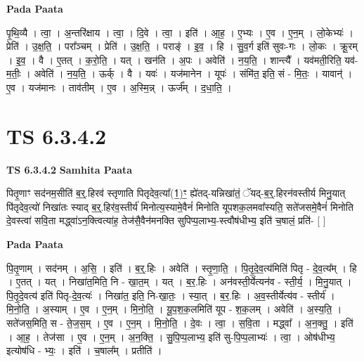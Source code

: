 \documentclass[17pt]{extarticle}
\begin{document}
\textbf{Pada Paata} \newline

पृ॒थि॒व्यै । त्वा॒ । अ॒न्तरि॑क्षाय । त्वा॒ । दि॒वे । त्वा॒ । इति॑ । आ॒ह॒ । ए॒भ्यः । ए॒व । ए॒न॒म् । लो॒केभ्यः॑ । प्रेति॑ । उ॒क्ष॒ति॒ । परा᳚ञ्चम् । प्रेति॑ । उ॒क्ष॒ति॒ । पराङ्॑ । इ॒व॒ । हि । सु॒व॒र्ग इति॑ सुवः-गः । लो॒कः । क्रू॒रम् । इ॒व॒ । वै । ए॒तत् । क॒रो॒ति॒ । यत् । खन॑ति । अ॒पः । अवेति॑ । न॒य॒ति॒ । शान्त्यै᳚ । यव॑मती॒रिति॒ यव॑-म॒तीः॒ । अवेति॑ । न॒य॒ति॒ । ऊर्क् । वै । यवः॑ । यज॑मानेन । यूपः॑ । संमि॑त॒ इति॒ सं - मि॒तः॒ । यावान्॑ । ए॒व । यज॑मानः । ताव॑तीम् । ए॒व । अ॒स्मि॒न्न् । ऊर्ज᳚म् । द॒धा॒ति॒ ।  \newline





\section{ TS 6.3.4.2 }

\textbf{TS 6.3.4.2 } \newline
\textbf{Samhita Paata} \newline

पितृ॒णाꣳ सद॑नम॒सीति॑ ब॒र्॒.हिरव॑ स्तृणाति पितृदेव॒त्या᳚(1॒)ꣳ॒ ह्ये॑तद्-यन्निखा॑तं॒ ॅयद्-ब॒र्॒.हिरन॑वस्तीर्य मिनु॒यात् पि॑तृदेव॒त्यो॑ निखा॑तः स्याद् ब॒र्॒.हिर॑व॒स्तीर्य॑ मिनोत्य॒स्यामे॒वैनं॑ मिनोति यूपशक॒लमवा᳚स्यति॒ सते॑जसमे॒वैनं॑ मिनोति दे॒वस्त्वा॑ सवि॒ता मद्ध्वा॑ऽन॒क्त्वित्या॑ह॒ तेज॑सै॒वैन॑मनक्ति सुपिप्प॒लाभ्य॒-स्त्वौष॑धीभ्य॒ इति॑ च॒षालं॒ प्रति॑- [  ] \newline

\textbf{Pada Paata} \newline

पि॒तृ॒णाम् । सद॑नम् । अ॒सि॒ । इति॑ । ब॒र्॒.हिः । अवेति॑ । स्तृ॒णा॒ति॒ । पि॒तृ॒दे॒व॒त्य॑मिति॑ पितृ - दे॒व॒त्य᳚म् । हि । ए॒तत् । यत् । निखा॑त॒मिति॒ नि - खा॒त॒म् । यत् । ब॒र॒.हिः । अन॑वस्ती॒र्येत्यन॑व - स्ती॒र्य॒ । मि॒नु॒यात् । पि॒तृ॒दे॒वत्य॑ इति॑ पितृ-दे॒व॒त्यः॑ । निखा॑त॒ इति॒ नि-खा॒तः॒ । स्या॒त् । ब॒र॒.हिः । अ॒व॒स्तीर्येत्य॑व - स्तीर्य॑ । मि॒नो॒ति॒ । अ॒स्याम् । ए॒व । ए॒न॒म् । मि॒नो॒ति॒ । यू॒प॒श॒क॒लमिति॑ यूप - श॒क॒लम् । अवेति॑ । अ॒स्य॒ति॒ । सते॑जस॒मिति॒ स - ते॒ज॒स॒म् । ए॒व । ए॒न॒म् । मि॒नो॒ति॒ । दे॒वः । त्वा॒ । स॒वि॒ता । मद्ध्वा᳚ । अ॒न॒क्तु॒ । इति॑ । आ॒ह॒ । तेज॑सा । ए॒व । ए॒न॒म् । अ॒न॒क्ति॒ । सु॒पि॒प्प॒लाभ्य॒ इति॑ सु-पि॒प्प॒लाभ्यः॑ । त्वा॒ । ओष॑धीभ्य॒ इत्योष॑धि - भ्यः॒ । इति॑ । च॒षाल᳚म् । प्रतीति॑ ।  \newline
\end{document}
